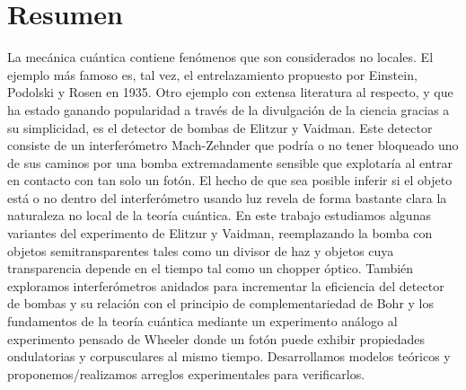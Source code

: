 \documentclass[12pt]{book}
\newcommand\blankpage{
    \null
    \thispagestyle{empty}
    \addtocounter{page}{0}
    \newpage
    }
\begin{document}
\pagebreak



\blankpage{}
\chapter*{Resumen}

La mecánica cuántica contiene fenómenos que son considerados no locales. El ejemplo más famoso es, tal vez, el entrelazamiento propuesto por Einstein, Podolski y Rosen en 1935. Otro ejemplo con extensa literatura al respecto, y que ha estado ganando popularidad a través de la divulgación de la ciencia gracias a su simplicidad, es el detector de bombas de Elitzur y Vaidman. Este detector consiste de un interferómetro  Mach-Zehnder que podría o no tener bloqueado uno de sus caminos por una bomba extremadamente sensible que explotaría al entrar en contacto con tan solo un fotón. El hecho de que sea posible inferir si el objeto está o no dentro del interferómetro usando luz revela de forma bastante clara la naturaleza no local de la teoría cuántica. En este trabajo estudiamos algunas variantes del experimento de Elitzur y Vaidman, reemplazando la bomba con objetos semitransparentes tales como un divisor de haz y objetos cuya transparencia depende en el tiempo tal como un chopper óptico. También exploramos interferómetros anidados para incrementar la eficiencia del detector de bombas y su relación con el principio de complementariedad de Bohr y los fundamentos de la teoría cuántica mediante un experimento análogo al experimento pensado de Wheeler donde un fotón puede exhibir propiedades ondulatorias y corpusculares al mismo tiempo. Desarrollamos modelos teóricos y proponemos/realizamos arreglos experimentales para verificarlos.
\thispagestyle{plain}

\pagebreak



\blankpage{}
\end{document}
